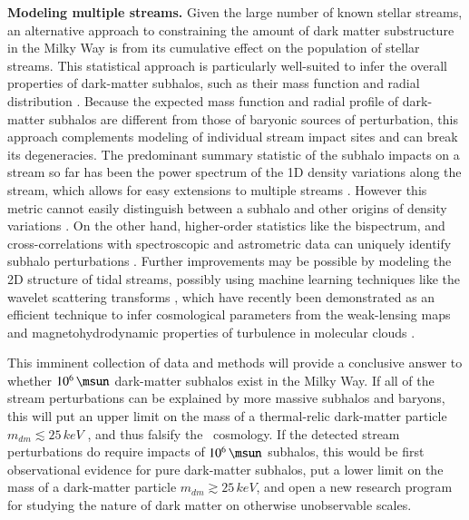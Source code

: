 \documentclass[final,5p,times,twocolumn,authoryear]{elsarticle}
\begin{document}
\textbf{Modeling multiple streams.}
Given the large number of known stellar streams, an alternative approach to constraining the amount of dark matter substructure in the Milky Way is from its cumulative effect on the population of stellar streams.
This statistical approach is particularly well-suited to infer the overall properties of dark-matter subhalos, such as their mass function and radial distribution \citep[e.g.,][]{carlberg:2013,banik:2021b}.
Because the expected mass function and radial profile of dark-matter subhalos are different from those of baryonic sources of perturbation, this approach complements modeling of individual stream impact sites and can break its degeneracies.
The predominant summary statistic of the subhalo impacts on a stream so far has been the power spectrum of the 1D density variations along the stream, which allows for easy extensions to multiple streams \citep[e.g.,][]{banik:2021, banik:2021b}.
However this metric cannot easily distinguish between a subhalo and other origins of density variations \citep[e.g., epicycles,][]{ibata:2020}.
On the other hand, higher-order statistics like the bispectrum, and cross-correlations with spectroscopic and astrometric data can uniquely identify subhalo perturbations \citep[e.g.,][]{bovy:2017}.
Further improvements may be possible by modeling the 2D structure of tidal streams, possibly using machine learning techniques like the wavelet scattering transforms \citep{mallat:2012}, which have recently been demonstrated as an efficient technique to infer cosmological parameters from the weak-lensing maps \citep{cheng:2020} and magnetohydrodynamic properties of turbulence in molecular clouds \citep{saydjari:2021}.

\vspace{0.5cm}

This imminent collection of data and methods will provide a conclusive answer to whether $10^6\,\unit{\msun}$ dark-matter subhalos exist in the Milky Way.
If all of the stream perturbations can be explained by more massive subhalos and baryons, this will put an upper limit on the mass of a thermal-relic dark-matter particle $m_{dm}\lesssim 25\,\unit{keV}$ \citep[Equation~2.3 in][]{drlica-wagner:2019}, and thus falsify the \lcdm\ cosmology.
If the detected stream perturbations do require impacts of $10^6\,\unit{\msun}$ subhalos, this would be first observational evidence for pure dark-matter subhalos, put a lower limit on the mass of a dark-matter particle $m_{dm}\gtrsim 25\,\unit{keV}$, and open a new research program for studying the nature of dark matter on otherwise unobservable scales.
\end{document}
